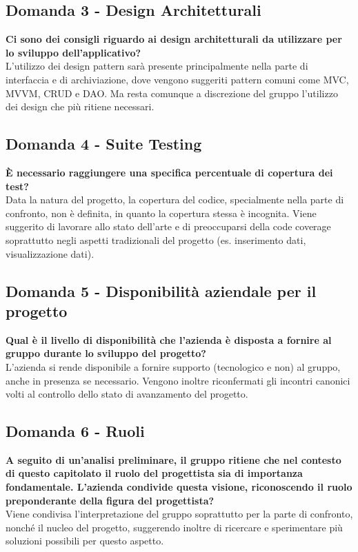 \documentclass[10pt]{article}
\begin{document}
    \subsection{Domanda 3 - Design Architetturali}
    \textbf{Ci sono dei consigli riguardo ai design architetturali da utilizzare per lo sviluppo dell'applicativo?} 
    \\
    \textnormal{L'utilizzo dei design pattern sarà presente principalmente nella parte di interfaccia e di archiviazione, dove vengono suggeriti pattern comuni come MVC, MVVM, CRUD e DAO.
    Ma resta comunque a discrezione del gruppo l'utilizzo dei design che più ritiene necessari.} 
    
    \subsection{Domanda 4 - Suite Testing}
    \textbf{È necessario raggiungere una specifica percentuale di copertura dei test?} 
    \\
    \textnormal{Data la natura del progetto, la copertura del codice, specialmente nella parte di confronto, non è definita, in quanto la copertura stessa è incognita.
    Viene suggerito di lavorare allo stato dell'arte e di preoccuparsi della code coverage soprattutto negli aspetti tradizionali del progetto (es. inserimento dati, visualizzazione dati).} 
    
    \subsection{Domanda 5 - Disponibilità aziendale per il progetto}
    \textbf{Qual è il livello di disponibilità che l'azienda è disposta a fornire al gruppo durante lo sviluppo del progetto?} 
    \\
    \textnormal{L'azienda si rende disponibile a fornire supporto (tecnologico e non) al gruppo, anche in presenza se necessario. 
    Vengono inoltre riconfermati gli incontri canonici volti al controllo dello stato di avanzamento del progetto.}

    \subsection{Domanda 6 - Ruoli}
    \textbf{A seguito di un'analisi preliminare, il gruppo ritiene che nel contesto di questo capitolato il ruolo del progettista sia di importanza fondamentale. L'azienda condivide questa visione, riconoscendo il ruolo preponderante della figura del progettista?} 
    \\
    \textnormal{Viene condivisa l'interpretazione del gruppo soprattutto per la parte di confronto, nonché il nucleo del progetto, suggerendo inoltre di ricercare e sperimentare più soluzioni possibili per questo aspetto.} 
\end{document}
